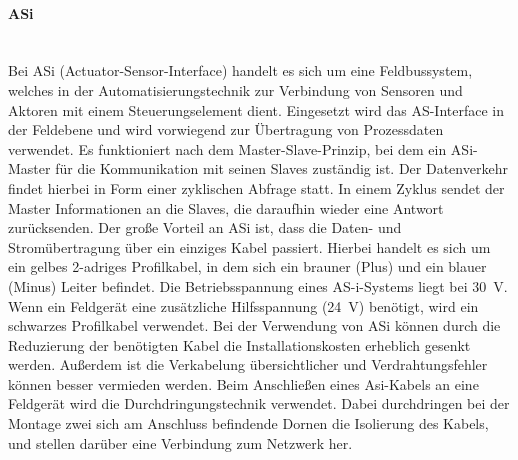 \paragraph{ASi \cite{ASi}}\label{par:ASi}\mbox{}\\
Bei ASi (Actuator-Sensor-Interface) handelt es sich um eine Feldbussystem, welches in der Automatisierungstechnik zur Verbindung von Sensoren und Aktoren mit einem Steuerungselement dient. Eingesetzt wird das AS-Interface in der Feldebene und wird vorwiegend zur Übertragung von Prozessdaten verwendet. Es funktioniert nach dem Master-Slave-Prinzip, bei dem ein ASi-Master für die Kommunikation mit seinen Slaves zuständig ist. Der Datenverkehr findet hierbei in Form einer zyklischen Abfrage statt. In einem Zyklus sendet der Master Informationen an die Slaves, die daraufhin wieder eine Antwort zurücksenden. Der große Vorteil an ASi ist, dass die Daten- und Stromübertragung über ein einziges Kabel passiert. Hierbei handelt es sich um ein gelbes 2-adriges Profilkabel, in dem sich ein brauner (Plus) und ein blauer (Minus) Leiter befindet. Die Betriebsspannung eines AS-i-Systems liegt bei \qty{30}{\volt}. Wenn ein Feldgerät eine zusätzliche Hilfsspannung (\qty{24}{\volt}) benötigt, wird ein schwarzes Profilkabel verwendet. Bei der Verwendung von ASi können durch die Reduzierung der benötigten Kabel die Installationskosten erheblich gesenkt werden. Außerdem ist die Verkabelung übersichtlicher und Verdrahtungsfehler können besser vermieden werden. Beim Anschließen eines Asi-Kabels an eine Feldgerät wird die Durchdringungstechnik verwendet. Dabei durchdringen bei der Montage zwei sich am Anschluss befindende Dornen die Isolierung des Kabels, und stellen darüber eine Verbindung zum Netzwerk her.

